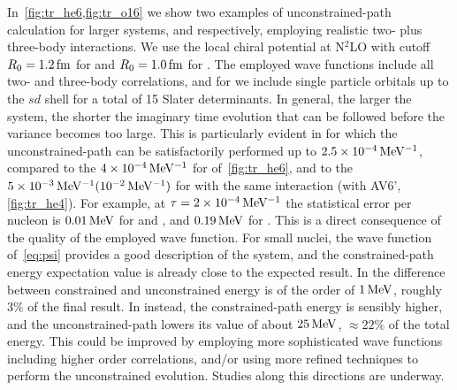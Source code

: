 \documentclass[aps,prc,twocolumn,superscriptaddress,showpacs,floatfix,nofootinbib]{revtex4-1}
\begin{document}
In~\cref{fig:tr_he6,fig:tr_o16} we show two examples of unconstrained-path calculation for larger systems,
 and  respectively, employing realistic two- plus three-body interactions. 
We use the local chiral potential at N$^2$LO with cutoff $R_0=1.2\,\rm fm$ for 
 and $R_0=1.0\,\rm fm$ for . The employed wave functions include 
all two- and three-body correlations, and for  we include single particle orbitals 
up to the $sd$ shell for a total of 15 Slater determinants. In general, the larger the system, the shorter 
the imaginary time evolution that can be followed before the variance becomes 
too large. 
This is particularly evident in  for which the unconstrained-path 
can be satisfactorily performed up to $2.5\times10^{-4}\,\rm MeV^{-1}$, 
compared to the $4\times10^{-4}\,\rm MeV^{-1}$
for  of~\cref{fig:tr_he6}, and to the $5\times10^{-3}\,\rm MeV^{-1}(10^{-2}\,\rm MeV^{-1})$ 
for  with the same interaction (with AV6', \cref{fig:tr_he4}).
For example, at $\tau=2\times10^{-4}\,\rm MeV^{-1}$ the statistical error per nucleon is  
$0.01\,\rm MeV$ for  and , and $0.19\,\rm MeV$ for .
This is a direct consequence of the quality of the employed wave function. 
For small nuclei, the wave function of~\cref{eq:psi} provides a good description of the
system, and the constrained-path energy expectation value is already close to the expected result. 
In  the difference between constrained and unconstrained energy is of 
the order of $1\,\rm MeV$, roughly $3\%$ of the final result. 
In  instead, the constrained-path energy is sensibly higher, 
and the unconstrained-path lowers 
its value of about $25\,\rm MeV$, $\approx22\%$ of the total energy.
This could be improved by employing more sophisticated wave functions including higher order
correlations, and/or using more refined techniques to perform the unconstrained evolution. 
Studies along this directions are underway.

\end{document}
